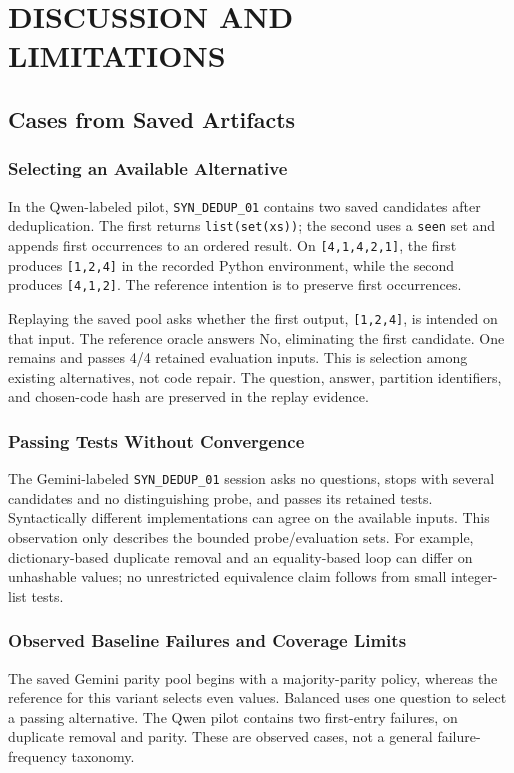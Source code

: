 \section{DISCUSSION AND LIMITATIONS}\label{sec:discussion}
\subsection{Cases from Saved Artifacts}
\subsubsection{Selecting an Available Alternative}
In the Qwen-labeled pilot, \texttt{SYN\_DEDUP\_01} contains two saved candidates after deduplication. The first returns \texttt{list(set(xs))}; the second uses a \texttt{seen} set and appends first occurrences to an ordered result. On \texttt{[4,1,4,2,1]}, the first produces \texttt{[1,2,4]} in the recorded Python environment, while the second produces \texttt{[4,1,2]}. The reference intention is to preserve first occurrences.

Replaying the saved pool asks whether the first output, \texttt{[1,2,4]}, is intended on that input. The reference oracle answers No, eliminating the first candidate. One remains and passes 4/4 retained evaluation inputs. This is selection among existing alternatives, not code repair. The question, answer, partition identifiers, and chosen-code hash are preserved in the replay evidence.

\subsubsection{Passing Tests Without Convergence}
The Gemini-labeled \texttt{SYN\_DEDUP\_01} session asks no questions, stops with several candidates and no distinguishing probe, and passes its retained tests. Syntactically different implementations can agree on the available inputs. This observation only describes the bounded probe/evaluation sets. For example, dictionary-based duplicate removal and an equality-based loop can differ on unhashable values; no unrestricted equivalence claim follows from small integer-list tests.

\subsubsection{Observed Baseline Failures and Coverage Limits}
The saved Gemini parity pool begins with a majority-parity policy, whereas the reference for this variant selects even values. Balanced uses one question to select a passing alternative. The Qwen pilot contains two first-entry failures, on duplicate removal and parity. These are observed cases, not a general failure-frequency taxonomy.

